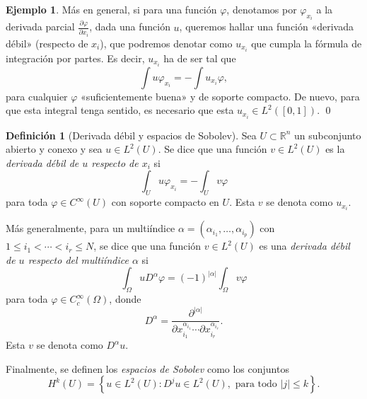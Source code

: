 \documentclass[12pt,a4paper]{article}
\theoremstyle{definition} \newtheorem{defn}[thm]{Definición}
\theoremstyle{definition} \newtheorem{ejemplo}[thm]{Ejemplo}
\theoremstyle{definition} \newtheorem{ejercicio}[thm]{Ejercicio}
\theoremstyle{remark} \newtheorem*{obs}{Observación}
\newcommand{\RR}{\mathbb{R}}
\begin{document}
\begin{ejemplo}
  Más en general, si para una función $\varphi$, denotamos por $\varphi_{x_i}$ a la derivada parcial $\frac{\partial \varphi}{\partial x_i}$, dada una función $u$, queremos hallar una función «derivada débil» (respecto de $x_i$), que podremos denotar como $u_{x_i}$ que cumpla la fórmula de integración por partes. Es decir, $u_{x_i}$ ha de ser tal que
  \begin{equation*}
    \int u \varphi_{x_i}=-\int u_{x_i} \varphi,
  \end{equation*}
  para cualquier $\varphi$ «suficientemente buena» y de soporte compacto. De nuevo, para que esta integral tenga sentido, es necesario que esta $u_{x_i}\in L^2([0,1])$. \qed
\end{ejemplo}

\begin{defn}[Derivada débil y espacios de Sobolev]
 Sea $U\subset \RR^n$ un subconjunto abierto y conexo y sea $u\in L^2(U)$. Se dice que una función $v\in L^2(U)$ es la \emph{derivada débil de $u$ respecto de $x_i$} si 
  \begin{equation*}
    \int_U u \varphi_{x_i}= -\int_{U} v \varphi
  \end{equation*}
  para toda $\varphi\in C^{\infty}(U)$ con soporte compacto en $U$. Esta $v$ se denota como $u_{x_i}$. 

  Más generalmente, para un multiíndice $\alpha=(\alpha_{i_1},\dots,\alpha_{i_p})$ con $1\leq i_1 <\cdots < i_r \leq N$, se dice que una función $v\in L^2(U)$ es una \emph{derivada débil de $u$ respecto del multiíndice $\alpha$}  si
  \begin{equation*}
    \int_{\Omega} u D^{\alpha} \varphi = (-1)^{|\alpha|} \int_{\Omega} v \varphi
  \end{equation*}
  para toda $\varphi \in C^{\infty}_c(\Omega)$, donde 
  \begin{equation*}
    D^{\alpha}=\frac{\partial^{|\alpha|}}{\partial x_{i_1}^{\alpha_{i_1}}\cdots \partial x_{i_r}^{\alpha_{i_r}}}.
  \end{equation*}
  Esta $v$ se denota como $D^\alpha u$.

  Finalmente, se definen los \emph{espacios de Sobolev} como los conjuntos
  \begin{equation*}
    H^{k}(U)=\left\{ u \in L^2(U): D^j u \in L^2(U), \text{ para todo } |j|\leq k  \right\}.
  \end{equation*}
\end{defn}
\end{document}
